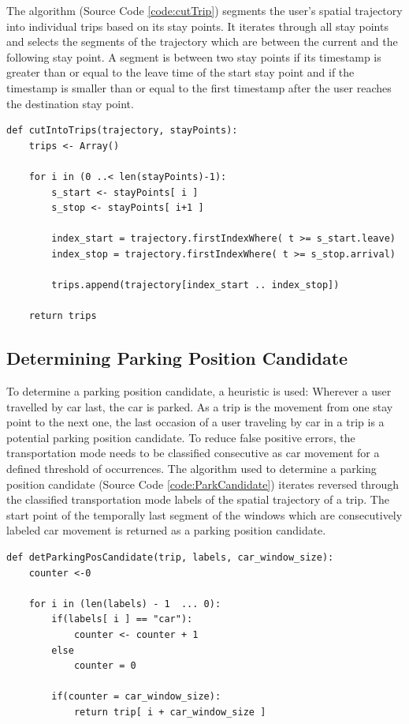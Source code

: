 The algorithm (Source Code \ref{code:cutTrip}) segments the user's spatial trajectory into individual trips based on its stay points. It iterates through all stay points and selects the segments of the trajectory which are between the current and the following stay point. A segment is between two stay points if its timestamp is greater than or equal to the leave time of the start stay point and if the timestamp is smaller than or equal to the first timestamp after the user reaches the destination stay point. 

\begin{lstlisting}[style=py, caption={Pseudocode: Determine Trips in a Trajectory}, label={code:cutTrip}]
def cutIntoTrips(trajectory, stayPoints):
    trips <- Array()
    
    for i in (0 ..< len(stayPoints)-1):
        s_start <- stayPoints[ i ]
        s_stop <- stayPoints[ i+1 ]
        
        index_start = trajectory.firstIndexWhere( t >= s_start.leave)
        index_stop = trajectory.firstIndexWhere( t >= s_stop.arrival)
        
        trips.append(trajectory[index_start .. index_stop])
    
    return trips
\end{lstlisting}


\subsection{Determining Parking Position Candidate}

To determine a parking position candidate, a heuristic is used: Wherever a user travelled by car last, the car is parked. As a trip is the movement from one stay point to the next one, the last occasion of a user traveling by car in a trip is a potential parking position candidate. To reduce false positive errors, the transportation mode needs to be classified consecutive as car movement for a defined threshold of occurrences. The algorithm used to determine a parking position candidate (Source Code \ref{code:ParkCandidate}) iterates reversed through the classified transportation mode labels of the spatial trajectory of a trip. The start point of the temporally last segment of the windows which are consecutively labeled car movement is returned as a parking position candidate. 

\begin{lstlisting}[style=py, caption={Pseudocode: Determine Parking Position Candidate}, label={code:ParkCandidate}]
def detParkingPosCandidate(trip, labels, car_window_size):
    counter <-0
    
    for i in (len(labels) - 1  ... 0):
        if(labels[ i ] == "car"):
            counter <- counter + 1
        else
            counter = 0
        
        if(counter = car_window_size):
            return trip[ i + car_window_size ]
   
\end{lstlisting}

